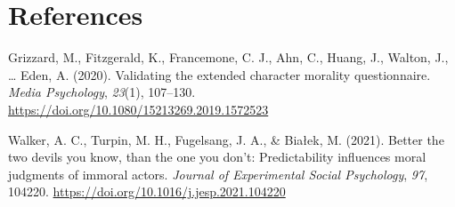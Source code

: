 \documentclass[
  man,floatsintext]{apa6}
\newlength{\cslhangindent}
\newenvironment{CSLReferences}[2] %
 {\begin{list}{}{%
  \setlength{\itemindent}{0pt}
  \setlength{\leftmargin}{0pt}
  \setlength{\parsep}{0pt}
  \ifodd #1
   \setlength{\leftmargin}{\cslhangindent}
   \setlength{\itemindent}{-1\cslhangindent}
  \fi
  \setlength{\itemsep}{#2\baselineskip}}}
 {\end{list}}
\begin{document}
\pagebreak

\section*{References}\label{references}

\label{refs}
\begin{CSLReferences}{1}{0}
Grizzard, M., Fitzgerald, K., Francemone, C. J., Ahn, C., Huang, J., Walton, J., \ldots{} Eden, A. (2020). Validating the extended character morality questionnaire. \emph{Media Psychology}, \emph{23}(1), 107--130. \url{https://doi.org/10.1080/15213269.2019.1572523}

Walker, A. C., Turpin, M. H., Fugelsang, J. A., \& Białek, M. (2021). Better the two devils you know, than the one you don't: {Predictability} influences moral judgments of immoral actors. \emph{Journal of Experimental Social Psychology}, \emph{97}, 104220. \url{https://doi.org/10.1016/j.jesp.2021.104220}

\end{CSLReferences}
\end{document}
